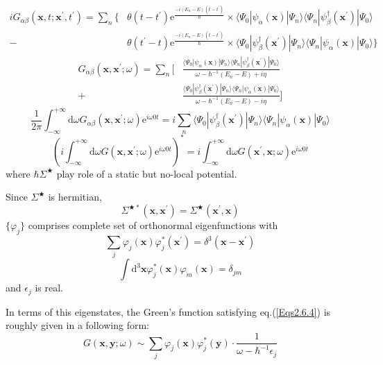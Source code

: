 \[ \begin{split} iG_{\alpha\beta}(\mathbf{x},t;\mathbf{x}^{'},t^{'}) =
 \sum_{n} \{ &\theta(t-t^{'}) \mathrm{e}^{\frac{-i(E_{n}-E)(t-t^{'})}{\hbar}} \times \langle \Psi_{0} | \psi_{\alpha}(\mathbf{x}) | \Psi_{n} \rangle \langle \Psi_{n} | \psi_{\beta}^{\dagger}(\mathbf{x}^{'}) | \Psi_{0} \rangle  \\
- \ &\theta(t^{'}-t) \mathrm{e}^{\frac{-i(E_{n}-E)(t-t^{'})}{\hbar}} \times \langle \Psi_{0} | \psi_{\beta}^{\dagger}(\mathbf{x}^{'}) | \Psi_{n} \rangle \langle \Psi_{n} | \psi_{\alpha}(\mathbf{x}) | \Psi_{0} \rangle \}
\end{split} \]
\[ \begin{split} G_{\alpha\beta}(\mathbf{x},\mathbf{x}^{'};\omega) = \sum_{n} [ 
&\frac{\langle \Psi_{0} | \psi_{\alpha}(\mathbf{x}) | \Psi_{n} \rangle \langle \Psi_{n} | \psi_{\beta}^{\dagger}(\mathbf{x}^{'}) | \Psi_{0} \rangle}{\omega-\hbar^{-1}(E_{n}-E)+i\eta} \\
+&\frac{\langle \Psi_{0} | \psi_{\beta}^{\dagger}(\mathbf{x}^{'}) | \Psi_{n} \rangle \langle \Psi_{n} | \psi_{\alpha}(\mathbf{x}) | \Psi_{0} \rangle}{\omega-\hbar^{-1}(E_{n}-E)-i\eta} ]
\end{split} \]
\[ \frac{1}{2\pi} \int_{-\infty}^{+\infty} \mathrm{d}\omega G_{\alpha\beta}(\mathbf{x},\mathbf{x}^{'};\omega)\mathrm{e}^{i\omega 0 t} = i \sum_{n} \langle \Psi_{0} | \psi_{\beta}^{\dagger}(\mathbf{x}^{'}) | \Psi_{n} \rangle \langle \Psi_{n} | \psi_{\alpha}(\mathbf{x}) | \Psi_{0} \rangle \]
\[ {\left ( i \int_{-\infty}^{+\infty} \mathrm{d} \omega G(\mathbf{x},\mathbf{x}^{'};\omega)\mathrm{e}^{i \omega 0 t} \right )}^{*} = i \int_{-\infty}^{+\infty} \mathrm{d} \omega G(\mathbf{x}^{'},\mathbf{x};\omega)\mathrm{e}^{i \omega 0 t} \]
where $\hbar\Sigma^\bigstar$ play role of a static but no-local potential.

Since $\Sigma^\bigstar$ is hermitian,\[\Sigma^{\bigstar*}(\mathbf{x},\mathbf{x}^{'}) = \Sigma^\bigstar(\mathbf{x}^{'},\mathbf{x}) \]
$\{\varphi_{j}\}$ comprises complete set of orthonormal eigenfunctions with
\[ \sum_{j} \varphi_{j}(\mathbf{x})\varphi_{j}^{*}(\mathbf{x}^{'}) = \delta^{3}(\mathbf{x}-\mathbf{x}^{'}) \]
\[ \int \mathrm{d}^3 \mathbf{x} \varphi_j^*(\mathbf{x})\varphi_m(\mathbf{x}) = \delta_{jm} \]
and $\epsilon_j$ is real.

In terms of this eigenstates, the Green's function satisfying eq.(\ref{Eqs2.6.4}) is roughly given in a following form:
\[ G(\mathbf{x},\mathbf{y};\omega) \sim \sum_j \varphi_j(\mathbf{x})\varphi_j^*(\mathbf{y}) \cdot \frac{1}{\omega-\hbar^{-1}\epsilon_j} \]


